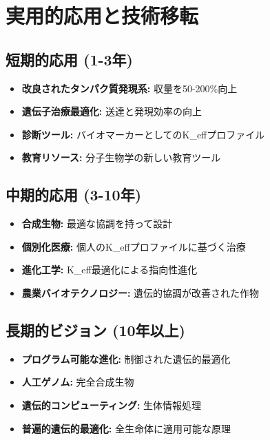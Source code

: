 \documentclass[12pt]{article}
\begin{document}
	\section{実用的応用と技術移転}
	
	\subsection{短期的応用 (1-3年)}
	
	\begin{itemize}
		\item \textbf{改良されたタンパク質発現系:} 収量を50-200\%向上
		\item \textbf{遺伝子治療最適化:} 送達と発現効率の向上
		\item \textbf{診断ツール:} バイオマーカーとしてのK\_effプロファイル
		\item \textbf{教育リソース:} 分子生物学の新しい教育ツール
	\end{itemize}
	
	\subsection{中期的応用 (3-10年)}
	
	\begin{itemize}
		\item \textbf{合成生物:} 最適な協調を持って設計
		\item \textbf{個別化医療:} 個人のK\_effプロファイルに基づく治療
		\item \textbf{進化工学:} K\_eff最適化による指向性進化
		\item \textbf{農業バイオテクノロジー:} 遺伝的協調が改善された作物
	\end{itemize}
	
	\subsection{長期的ビジョン (10年以上)}
	
	\begin{itemize}
		\item \textbf{プログラム可能な進化:} 制御された遺伝的最適化
		\item \textbf{人工ゲノム:} 完全合成生物
		\item \textbf{遺伝的コンピューティング:} 生体情報処理
		\item \textbf{普遍的遺伝的最適化:} 全生命体に適用可能な原理
	\end{itemize}
	
\end{document}
